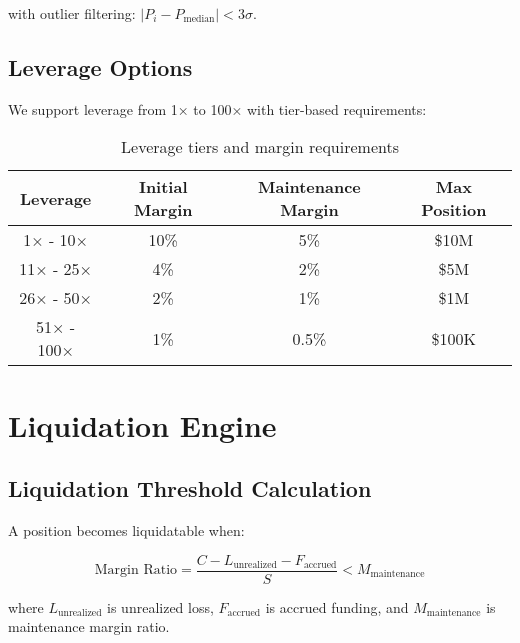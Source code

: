 \documentclass[11pt,a4paper]{article}
\begin{document}
with outlier filtering: $|P_i - P_{\text{median}}| < 3\sigma$.

\subsection{Leverage Options}

We support leverage from 1× to 100× with tier-based requirements:

\begin{table}[h]
\centering
\begin{tabular}{|c|c|c|c|}
\hline
\textbf{Leverage} & \textbf{Initial Margin} & \textbf{Maintenance Margin} & \textbf{Max Position} \\
\hline
1× - 10× & 10\% & 5\% & \$10M \\
11× - 25× & 4\% & 2\% & \$5M \\
26× - 50× & 2\% & 1\% & \$1M \\
51× - 100× & 1\% & 0.5\% & \$100K \\
\hline
\end{tabular}
\caption{Leverage tiers and margin requirements}
\end{table}

\section{Liquidation Engine}

\subsection{Liquidation Threshold Calculation}

A position becomes liquidatable when:

\begin{equation}
\text{Margin Ratio} = \frac{C - L_{\text{unrealized}} - F_{\text{accrued}}}{S} < M_{\text{maintenance}}
\end{equation}

where $L_{\text{unrealized}}$ is unrealized loss, $F_{\text{accrued}}$ is accrued funding, and $M_{\text{maintenance}}$ is maintenance margin ratio.
\end{document}
